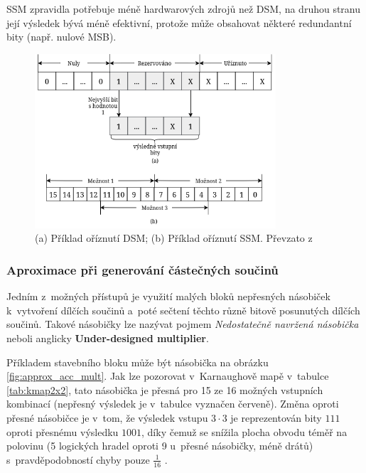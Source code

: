 SSM zpravidla potřebuje méně hardwarových zdrojů než DSM, na druhou stranu její výsledek bývá méně efektivní, protože může obsahovat některé redundantní bity (např. nulové MSB).

\begin{figure}[H]
    \centering
    \includegraphics[width=0.8\textwidth]{obrazky-figures/dsm_ssm.png}
    \caption{(a) Příklad oříznutí DSM; (b) Příklad oříznutí SSM. Převzato z~\cite{approx_mult_survey}}
    \label{fig:dsm_ssm}
\end{figure}

\subsubsection{Aproximace při generování částečných součinů}
Jedním z~možných přístupů je využití malých bloků nepřesných násobiček k~vytvoření dílčích součinů a~poté sečtení těchto různě bitově posunutých dílčích součinů. Takové násobičky lze nazývat pojmem \textit{Nedostatečně navržená násobička} neboli anglicky \textbf{Under-designed multiplier}. 

Příkladem stavebního bloku může být násobička na obrázku \ref{fig:approx_acc_mult}. Jak lze pozorovat v~Karnaughově mapě v~tabulce \ref{tab:kmap2x2}, tato násobička je přesná pro 15 ze 16 možných vstupních kombinací (nepřesný výsledek je v~tabulce vyznačen červeně). Změna oproti přesné násobičce je v~tom, že výsledek vstupu $3\cdot3$ je reprezentován bity $111$ oproti přesnému výsledku $1001$, díky čemuž se snížila plocha obvodu téměř na polovinu (5 logických hradel oproti 9 u~přesné násobičky, méně drátů) s~pravděpodobností chyby pouze $\frac{1}{16}$ \cite{underdesigned_mult}.


